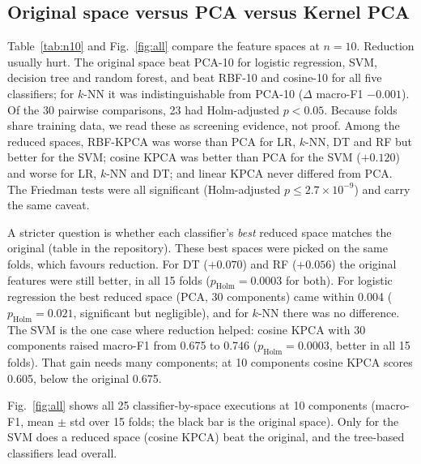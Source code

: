 \documentclass[runningheads]{llncs}
\begin{document}
\subsection{Original space versus PCA versus Kernel PCA}
Table~\ref{tab:n10} and Fig.~\ref{fig:all} compare the feature spaces at $n=10$. Reduction usually hurt. The original space beat PCA-10 for logistic regression, SVM, decision tree and random forest, and beat RBF-10 and cosine-10 for all five classifiers; for $k$-NN it was indistinguishable from PCA-10 ($\Delta$ macro-F1 $-0.001$). Of the 30 pairwise comparisons, 23 had Holm-adjusted $p<0.05$. Because folds share training data, we read these as screening evidence, not proof. Among the reduced spaces, RBF-KPCA was worse than PCA for LR, $k$-NN, DT and RF but better for the SVM; cosine KPCA was better than PCA for the SVM ($+0.120$) and worse for LR, $k$-NN and DT; and linear KPCA never differed from PCA. The Friedman tests were all significant (Holm-adjusted $p\le 2.7\times10^{-9}$) and carry the same caveat.

A stricter question is whether each classifier's \emph{best} reduced space matches the original (table in the repository). These best spaces were picked on the same folds, which favours reduction. For DT ($+0.070$) and RF ($+0.056$) the original features were still better, in all 15 folds ($p_\mathrm{Holm}=0.0003$ for both). For logistic regression the best reduced space (PCA, 30 components) came within 0.004 ($p_\mathrm{Holm}=0.021$, significant but negligible), and for $k$-NN there was no difference. The SVM is the one case where reduction helped: cosine KPCA with 30 components raised macro-F1 from 0.675 to 0.746 ($p_\mathrm{Holm}=0.0003$, better in all 15 folds). That gain needs many components; at 10 components cosine KPCA scores 0.605, below the original 0.675.

\begin{table}[htbp]
\caption{Mean accuracy and macro-F1 at 10 components (original = 78 features); macro-F1 as mean $\pm$ std over 15 folds.}\label{tab:n10}
\centering\scriptsize
{\setlength{\tabcolsep}{7pt}\resizebox{\textwidth}{!}{}}
\end{table}



Fig.~\ref{fig:all} shows all 25 classifier-by-space executions at 10 components (macro-F1, mean $\pm$ std over 15 folds; the black bar is the original space). Only for the SVM does a reduced space (cosine KPCA) beat the original, and the tree-based classifiers lead overall.
\end{document}
